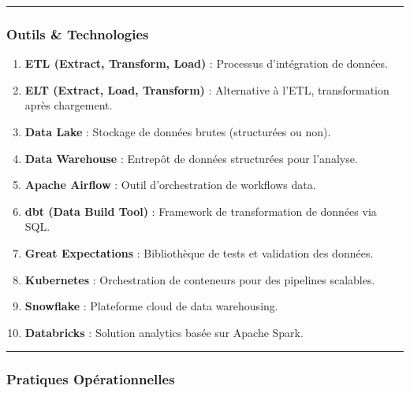 \documentclass[
  letterpaper,
  DIV=11,
  numbers=noendperiod]{scrartcl}
\providecommand{\tightlist}{%
  \setlength{\itemsep}{0pt}\setlength{\parskip}{0pt}}\usepackage{longtable,booktabs,array}
\begin{document}
\begin{center}\rule{0.5\linewidth}{0.5pt}\end{center}

\subsubsection{\texorpdfstring{\textbf{Outils \&
Technologies}}{Outils \& Technologies}}\label{outils-technologies}

\begin{enumerate}
\def\labelenumi{\arabic{enumi}.}
\setcounter{enumi}{10}
\tightlist
\item
  \textbf{ETL (Extract, Transform, Load)} : Processus d'intégration de
  données.\\
\item
  \textbf{ELT (Extract, Load, Transform)} : Alternative à l'ETL,
  transformation après chargement.\\
\item
  \textbf{Data Lake} : Stockage de données brutes (structurées ou
  non).\\
\item
  \textbf{Data Warehouse} : Entrepôt de données structurées pour
  l'analyse.\\
\item
  \textbf{Apache Airflow} : Outil d'orchestration de workflows data.\\
\item
  \textbf{dbt (Data Build Tool)} : Framework de transformation de
  données via SQL.\\
\item
  \textbf{Great Expectations} : Bibliothèque de tests et validation des
  données.\\
\item
  \textbf{Kubernetes} : Orchestration de conteneurs pour des pipelines
  scalables.\\
\item
  \textbf{Snowflake} : Plateforme cloud de data warehousing.\\
\item
  \textbf{Databricks} : Solution analytics basée sur Apache Spark.
\end{enumerate}

\begin{center}\rule{0.5\linewidth}{0.5pt}\end{center}

\subsubsection{\texorpdfstring{\textbf{Pratiques
Opérationnelles}}{Pratiques Opérationnelles}}\label{pratiques-opuxe9rationnelles}
\end{document}
